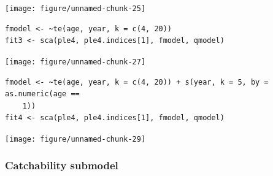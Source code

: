 \documentclass[a4paper,english,10pt]{article}\usepackage[]{graphicx}\usepackage[]{color}
\makeatletter
\newenvironment{kframe}{%
 \def\at@end@of@kframe{}%
 \ifinner\ifhmode%
  \def\at@end@of@kframe{\end{minipage}}%
  \begin{minipage}{\columnwidth}%
 \fi\fi%
 \def\FrameCommand##1{\hskip\@totalleftmargin \hskip-\fboxsep
 \colorbox{shadecolor}{##1}\hskip-\fboxsep
     \hskip-\linewidth \hskip-\@totalleftmargin \hskip\columnwidth}%
 \MakeFramed {\advance\hsize-\width
   \@totalleftmargin\z@ \linewidth\hsize
   \@setminipage}}%
 {\par\unskip\endMakeFramed%
 \at@end@of@kframe}
\newenvironment{knitrout}{}{} %
\makeatother
\begin{document}
\begin{knitrout}
\color{fgcolor}

{\centering \texttt{[image: figure/unnamed-chunk-25]} 

}



\end{knitrout}


\begin{knitrout}
\color{fgcolor}\begin{kframe}
\begin{verbatim}
fmodel <- ~te(age, year, k = c(4, 20))
fit3 <- sca(ple4, ple4.indices[1], fmodel, qmodel)
\end{verbatim}
\end{kframe}
\end{knitrout}


\begin{knitrout}
\color{fgcolor}

{\centering \texttt{[image: figure/unnamed-chunk-27]} 

}



\end{knitrout}


\begin{knitrout}
\color{fgcolor}\begin{kframe}
\begin{verbatim}
fmodel <- ~te(age, year, k = c(4, 20)) + s(year, k = 5, by = as.numeric(age == 
    1))
fit4 <- sca(ple4, ple4.indices[1], fmodel, qmodel)
\end{verbatim}
\end{kframe}
\end{knitrout}


\begin{knitrout}
\color{fgcolor}

{\centering \texttt{[image: figure/unnamed-chunk-29]} 

}



\end{knitrout}


\subsubsection{Catchability submodel}
\end{document}
